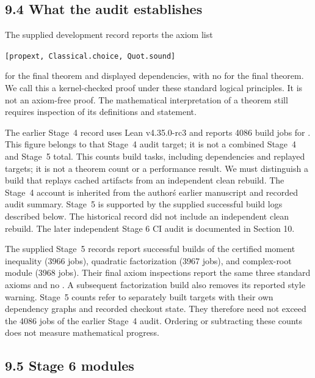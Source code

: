 \documentclass[
  11pt,
]{article}
\begin{document}
\hypertarget{what-the-audit-establishes}{%
\subsection{9.4 What the audit establishes}\label{what-the-audit-establishes}}

The supplied development record reports the axiom list

\texttt{{[}propext,\ Classical.choice,\ Quot.sound{]}}

for the final theorem and displayed dependencies, with no \texttt{} for the final theorem. We call this a kernel-checked proof under these standard logical principles. It is not an axiom-free proof. The mathematical interpretation of a theorem still requires inspection of its definitions and statement.

The earlier Stage~4 record uses Lean v4.35.0-rc3 and reports 4086 build jobs for . This figure belongs to that Stage~4 audit target; it is not a combined Stage~4 and Stage~5 total. This counts build tasks, including dependencies and replayed targets; it is not a theorem count or a performance result. We must distinguish a build that replays cached artifacts from an independent clean rebuild. The Stage~4 account is inherited from the authorś earlier manuscript and recorded audit summary. Stage~5 is supported by the supplied successful build logs described below. The historical record did not include an independent clean rebuild. The later independent Stage 6 CI audit is documented in Section 10.

The supplied Stage~5 records report successful builds of the certified moment inequality (3966 jobs), quadratic factorization (3967 jobs), and complex-root module (3968 jobs). Their final axiom inspections report the same three standard axioms and no \texttt{}. A subsequent factorization build also removes its reported style warning. Stage~5 counts refer to separately built targets with their own dependency graphs and recorded checkout state. They therefore need not exceed the 4086 jobs of the earlier Stage~4 audit. Ordering or subtracting these counts does not measure mathematical progress.

\hypertarget{stage-6-modules}{%
\subsection{9.5 Stage 6 modules}\label{stage-6-modules}}
\end{document}
